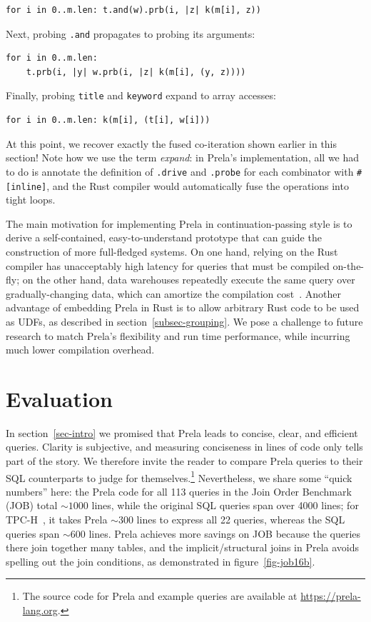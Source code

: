 \documentclass[sigconf,screen,pbalance]{cidr-2027}
\newcommand{\code}{\lstinline[style=prela]}
\begin{document}
\begin{lstlisting}
for i in 0..m.len: t.and(w).prb(i, |z| k(m[i], z))
\end{lstlisting}

Next, probing \code|.and| propagates to probing its arguments:

\begin{lstlisting}
for i in 0..m.len:
    t.prb(i, |y| w.prb(i, |z| k(m[i], (y, z))))
\end{lstlisting}

Finally, probing \code|title| and \code|keyword| expand to array accesses:

\begin{lstlisting}
for i in 0..m.len: k(m[i], (t[i], w[i]))
\end{lstlisting}

At this point, we recover exactly the fused co-iteration shown earlier in this section!
Note how we use the term \emph{expand}: in Prela's implementation, all we had to do is annotate the definition of \code|.drive| and \code|.probe| for each combinator with \code|#[inline]|, and the Rust compiler would automatically fuse the operations into tight loops.

The main motivation for implementing Prela in continuation-passing style is to derive a self-contained, easy-to-understand prototype that can guide the construction of more full-fledged systems.
On one hand, relying on the Rust compiler has unacceptably high latency for queries that must be compiled on-the-fly; on the other hand, data warehouses repeatedly execute the same query over gradually-changing data, which can amortize the compilation cost~\cite{DBLP:journals/pvldb/RenenHPVDNLSKK24}.
Another advantage of embedding Prela in Rust is to allow arbitrary Rust code to be used as UDFs, as described in section~\ref{subsec-grouping}.
We pose a challenge to future research to match Prela's flexibility and run time performance, while incurring much lower compilation overhead.

\section{Evaluation}

In section~\ref{sec-intro} we promised that Prela leads to concise, clear, and efficient queries.
Clarity is subjective, and measuring conciseness in lines of code only tells part of the story.
We therefore invite the reader to compare Prela queries to their SQL counterparts to judge for themselves.\footnote{The source code for Prela and example queries are available at \url{https://prela-lang.org}.}
Nevertheless, we share some ``quick numbers'' here: the Prela code for all 113 queries in the Join Order Benchmark~\cite{DBLP:journals/pvldb/LeisGMBK015} (JOB) total ${\sim}1000$ lines, while the original SQL queries span over 4000 lines; for TPC-H~\cite{tpch}, it takes Prela ${\sim}300$ lines to express all 22 queries, whereas the SQL queries span ${\sim}600$ lines.
Prela achieves more savings on JOB because the queries there join together many tables, and the implicit/structural joins in Prela avoids spelling out the join conditions, as demonstrated in figure~\ref{fig-job16b}.
\end{document}

